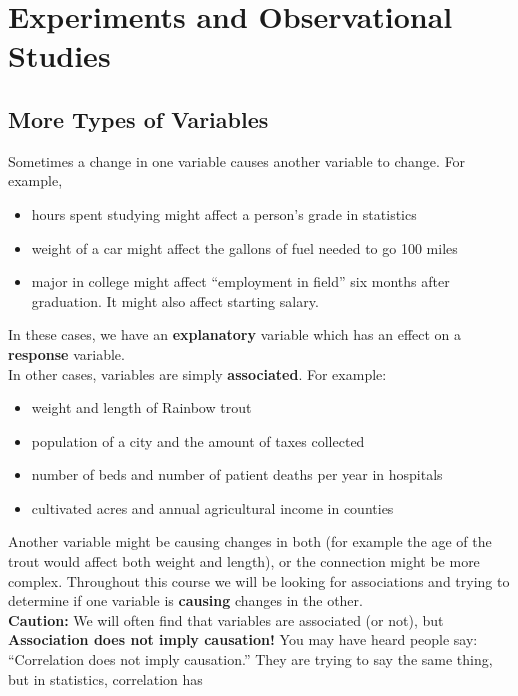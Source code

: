 \def\theTopic{Reading 9}

\section{ Experiments and Observational Studies}

\subsection{ More Types of Variables}


Sometimes a change in one variable causes another variable to change. 
For example, \vspace{-.18in}
\begin{itemize}
\item hours spent studying might affect a person's
grade in statistics
\item weight of a car might affect the gallons of fuel needed to go 100 miles
\item major in college might affect ``employment in field'' six months
  after graduation. It might also affect starting salary.
\end{itemize}
In these cases, we have an {\bf explanatory} variable which has an
effect on a  {\bf response} variable.  \\
In other cases, variables are simply {\bf associated}.  For example: \vspace{-.18in}
\begin{itemize}
\item weight and length of Rainbow trout
\item population of a city and the amount of taxes collected
\item number of beds  and  number of patient deaths per year
  in  hospitals
\item cultivated acres and annual agricultural income  in  counties
\end{itemize}
Another variable might be causing changes in both (for example the age
of the trout would affect both weight and length), or the connection might be
more complex.  Throughout this course we will be looking for
associations and trying to determine if one variable is {\bf causing}
changes in the other.  \\
{\bf Caution:} We will often find that variables are associated (or
  not), but {\bf Association does not imply causation!}   You may have
  heard people say: ``Correlation does not imply causation.''  They
  are trying to say the same thing, but in statistics, correlation has
